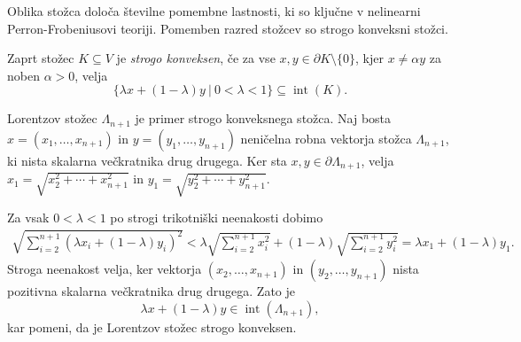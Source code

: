\documentclass[mat2, tisk]{fmfdelo}
\begin{document}
Oblika stožca določa številne pomembne lastnosti, ki so ključne v nelinearni
Perron-Frobeniusovi teoriji. Pomemben razred stožcev so strogo konveksni stožci.

\begin{definicija}
Zaprt stožec $K\subseteq V$ je \emph{strogo konveksen}, če za vse
$x,y\in\partial K\setminus\{0\}$, kjer $x\neq \alpha y$ za noben $\alpha>0$,
velja
\[
\{\lambda x+(1-\lambda)y ~|~ 0<\lambda<1\}\subseteq\operatorname{int}(K).
\]
\end{definicija}

\begin{zgled}
  Lorentzov stožec $\Lambda_{n+1}$ je primer strogo
  konveksnega stožca.
  Naj bosta $x=(x_1,\ldots,x_{n+1})$ in
  $y=(y_1,\ldots,y_{n+1})$ neničelna robna vektorja
  stožca $\Lambda_{n+1}$, ki nista skalarna večkratnika drug drugega.
  Ker sta $x,y\in\partial\Lambda_{n+1}$, velja
  $x_1=\sqrt{x_2^2+\cdots+x_{n+1}^2}$ in 
  $y_1=\sqrt{y_2^2+\cdots+y_{n+1}^2}$.

  Za vsak $0<\lambda<1$ po strogi trikotniški
  neenakosti dobimo
  \[
  \begin{aligned}
  \sqrt{\sum_{i=2}^{n+1}
  (\lambda x_i+(1-\lambda)y_i)^2}
  <
  \lambda\sqrt{\sum_{i=2}^{n+1}x_i^2}
  +(1-\lambda)\sqrt{\sum_{i=2}^{n+1}y_i^2}
  =\lambda x_1+(1-\lambda)y_1.
  \end{aligned}
  \]
  Stroga neenakost velja, ker vektorja
  $(x_2,\ldots,x_{n+1})$ in
  $(y_2,\ldots,y_{n+1})$ nista pozitivna skalarna večkratnika drug drugega.
  Zato je
  \[
  \lambda x+(1-\lambda)y\in
  \operatorname{int}(\Lambda_{n+1}),
  \]
  kar pomeni, da je Lorentzov stožec
  strogo konveksen.
\end{zgled}
\end{document}
